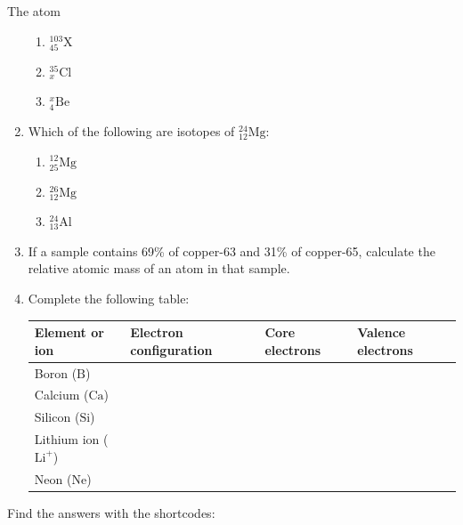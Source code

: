 \begin{eocexercises}{The atom}
\begin{enumerate}[noitemsep, label=\textbf{\arabic*}. ]
\begin{enumerate}[noitemsep, label=\textbf{\alph*}. ]
            \item $_{45}^{103}\text{X}$
\item $_{x}^{35}\text{Cl}$
\item $_{4}^{x}\text{Be}$
\end{enumerate}
\item Which of the following are isotopes of $_{12}^{24}\text{Mg}$: \label{m38741*id743234}
\begin{enumerate}[noitemsep, label=\textbf{\alph*}. ] 
            \item $_{25}^{12}\text{Mg}$
\item $_{12}^{26}\text{Mg}$
\item $_{13}^{24}\text{Al}$
\end{enumerate}
\item If a sample contains 69\% of copper-63 and 31\% of copper-65, calculate the relative atomic mass of an atom in that sample.\newline
            \item Complete the following table:
          \begin{table}[H]
        \begin{center}
      \label{m38741*eip-282}
    \noindent
      \begin{tabular}{|l|l|l|l|}\hline
        Element or ion &
        Electron configuration &
        Core electrons &
        Valence electrons \\ \hline
        Boron ($\text{B}$) &
         &
         &
       \\ \hline
        Calcium ($\text{Ca}$) &
         &
         &
     \\ \hline
        Silicon ($\text{Si}$) &
         &
         &
       \\ \hline
        Lithium ion ($\text{Li}^{+}$) &
         &
         &
      \\ \hline
        Neon ($\text{Ne}$) &
         &
         &
     \\ \hline
    \end{tabular}
      \end{center}
\end{table}
    \par
\end{enumerate}
  \label{m38741**end}
  \label{ea1c9e59656f96ee804546971cf6dee6**end}
\par {} Find the answers with the shortcodes:

\end{eocexercises}
